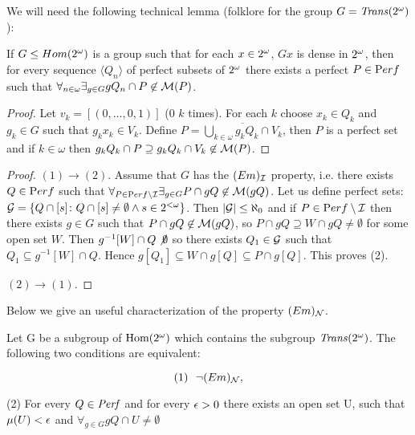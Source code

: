   We will need the following technical lemma
(folklore for the group $G = {\it Trans}(2^{\omega})$):
\begin{lemma}\label{lemma-dense}
If $G\leq Hom(2^{\omega})$ is a group such that for each 
$x\in2^{\omega}$, $Gx$ is dense in $2^{\omega}$,
then for every sequence $\langle Q_n\rangle$
of perfect subsets of $2^{\omega}$ there exists
a perfect $P\in{\mathrm Perf}$ such that 
$\forall_{n\in\omega} \exists_{g\in G} gQ_n \cap P 
\not \in \mathcal{M}(P)$.
\end{lemma}
\begin{proof}
Let $v_k = [(0,\ldots,0, 1)]$ ($0$ $k$ times).
For each $k$ choose $x_k\in Q_k$ and $g_k\in G$
such that $g_k x_k \in V_k$. Define
$P = \overline{\bigcup_{k\in\omega}g_k Q_k \cap V_k}$,
then $P$ is a perfect set and if $k\in\omega$
then 
$g_k Q_k \cap P \supseteq g_k Q_k \cap V_k \not\in \mathcal{M}(P)$.
\end{proof}

\begin{proof}%
$(1)\to (2)$.
Assume that $G$ has the $(Em)_{\cal I}$ property,
i.e. there exists $Q\in{\mathrm Perf}$ such that
$\forall_{P\in{\mathrm Perf}\setminus{\cal I}}\exists_{g\in G} 
P\cap gQ\not\in \mathcal{M}(gQ)$. 
Let us define perfect sets:
${\cal G} = \{Q \cap [s] \colon Q \cap [s] \not= \emptyset \wedge
s\in 2^{<\omega}\}$.
Then $|{\cal G}| \leq \aleph_0$ and if $P\in{\mathrm Perf}\setminus{\cal I}$
then there exists $g\in G$ such that
$P\cap gQ \not\in\mathcal{M}(gQ)$, so
$P\cap gQ \supseteq W\cap gQ \not= \emptyset$
for some open set $W$.
Then $g^{-1}[W] \cap Q \not\emptyset$
so there exists $Q_1\in {\cal G}$ such that
$Q_1 \subseteq g^{-1}[W] \cap Q$.
Hence $g[Q_1] \subseteq W \cap g[Q] \subseteq P \cap g[Q]$.
This proves (2).

$(2)\to(1)$.

\end{proof}

 
  Below we give an useful characterization of the
property $(Em)_{{\cal N}}$.

\medskip

\begin{theorem}
Let G be a subgroup of ${\rm Hom(2^{\omega})}$ which contains the
subgroup ${\it Trans}(2^{\omega})$. The following two conditions are
equivalent:

\[ (1)\ \ \neg (Em)_{{\cal N}}, \]

\par (2) For every $Q \in {\it Perf}$
and for every $\epsilon > 0$ there exists an open
set U, such that
$\mu(U) < \epsilon$
and $\forall_{g \in G} gQ \cap U \not = \emptyset$
\end{theorem}

